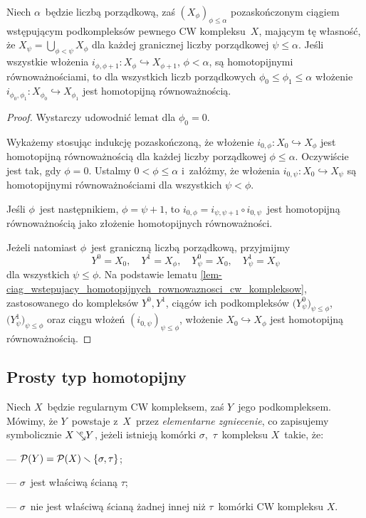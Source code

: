 \begin{lem} %
\label{lem-o_nieskonczonym_skladaniu_homotopijnych_rownowaznosci}
Niech $\alpha$~będzie liczbą porządkową, zaś $(X_\phi)_{\phi\leq \alpha}$ pozaskończonym ciągiem wstępującym podkompleksów pewnego CW kompleksu~$X$, mającym tę własność, że $X_\psi=\bigcup_{\phi<\psi}X_\phi$ dla każdej granicznej liczby porządkowej $\psi\leq\alpha$. Jeśli wszystkie włożenia $i_{\phi,\phi+1}\colon X_\phi\hookrightarrow X_{\phi+1}$, $\phi<\alpha$, są homotopijnymi równoważnościami, to dla wszystkich liczb porządkowych $\phi_0\leq\phi_1\leq \alpha$ włożenie $i_{\phi_0,\phi_1}\colon X_{\phi_0}\hookrightarrow X_{\phi_1}$ jest homotopijną równoważnością.
\end{lem}
\begin{proof}
Wystarczy udowodnić lemat dla $\phi_0=0$.

Wykażemy stosując indukcję pozaskończoną, że włożenie $i_{0,\phi}\colon X_0\hookrightarrow X_{\phi}$ jest homotopijną równoważnością dla każdej liczby porządkowej $\phi\leq \alpha$. Oczywiście jest tak, gdy $\phi=0$. Ustalmy $0<\phi\leq \alpha$ i~załóżmy, że włożenia $i_{0,\psi}\colon X_0\hookrightarrow X_{\psi}$ są homotopijnymi równoważnościami dla wszystkich $\psi<\phi$.

Jeśli $\phi$~jest następnikiem, $\phi=\psi+1$, to $i_{0,\phi}=i_{\psi,\psi+1}\circ i_{0,\psi}$~jest homotopijną równoważnością jako złożenie homotopijnych równoważności.

Jeżeli natomiast $\phi$~jest graniczną liczbą porządkową, przyjmijmy \[Y^0=X_0,\quad Y^1=X_{\phi},\quad Y^0_\psi=X_0,\quad Y^1_\psi=X_{\psi}\] dla wszystkich $\psi\leq\phi$. Na podstawie lematu \ref{lem-ciag_wstepujacy_homotopijnych_rownowaznosci_cw_kompleksow}, zastosowanego do kompleksów $Y^0,Y^1$, ciągów ich podkompleksów $\bigl(Y^0_\psi\bigr)_{\psi\leq \phi}$, $\bigl(Y^1_\psi\bigr)_{\psi\leq\phi}$ oraz ciągu włożeń $(i_{0,\psi})_{\psi\leq\phi}$, włożenie $X_0\hookrightarrow X_{\phi}$ jest homotopijną równoważnością.
\end{proof}


\subsection{Prosty typ homotopijny}
Niech $X$~będzie regularnym CW kompleksem, zaś $Y$~jego podkompleksem. Mówimy, że $Y$~powstaje z~$X$~przez \textit{elementarne zgniecenie}, co zapisujemy symbolicznie $X\mbox{$\hspace{2pt}\searrow\hspace{-9pt}^\mathrm{e}\hspace{2pt}$} Y$, jeżeli istnieją komórki $\sigma$,~$\tau$~kompleksu $X$~takie, że:
\begin{compactitem}
\item[---] $\mathcal{P}(Y)=\mathcal{P}(X)\smallsetminus \{\sigma, \tau\}$;
\item[---] $\sigma$~jest właściwą ścianą $\tau$;
\item[---] $\sigma$~nie jest właściwą ścianą żadnej innej niż $\tau$~komórki CW kompleksu $X$.
\end{compactitem}

